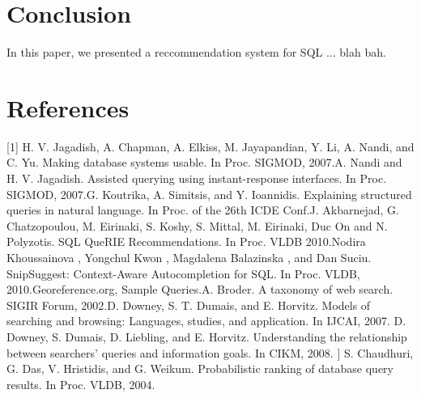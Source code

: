 \documentclass{acm_proc_article-sp}
\begin{document}
\section{Conclusion}
In this paper, we presented a reccommendation system for SQL ... blah bah. 

\section{References}
[1] H. V. Jagadish, A. Chapman, A. Elkiss, M. Jayapandian, Y. Li, A. Nandi, and C. Yu. Making database systems usable. In Proc. SIGMOD, 2007.\newline
[2] A. Nandi and H. V. Jagadish. Assisted querying using instant-response interfaces. In Proc. SIGMOD, 2007.\newline
[3] G. Koutrika, A. Simitsis, and Y. Ioannidis. Explaining structured queries in natural language. In Proc. of the 26th ICDE Conf.\newline
[4] J. Akbarnejad, G. Chatzopoulou, M. Eirinaki, S. Koshy, S. Mittal, M. Eirinaki, Duc On and N. Polyzotis. SQL QueRIE Recommendations. In Proc. VLDB 2010.\newline
[5] Nodira Khoussainova , Yongchul Kwon , Magdalena Balazinska , and Dan Suciu. SnipSuggest: Context-Aware Autocompletion for SQL. In Proc. VLDB, 2010.\newline
[6] Georeference.org, Sample Queries.\newline
[7] A. Broder. A taxonomy of web search. SIGIR Forum, 2002.\newline
[8] D. Downey, S. T. Dumais, and E. Horvitz. Models of searching and browsing: Languages, studies, and application. In IJCAI, 2007. \newline
[9] D. Downey, S. Dumais, D. Liebling, and E. Horvitz. Understanding the relationship between searchers’ queries and information goals. In CIKM, 2008. \newline
[10] ] S. Chaudhuri, G. Das, V. Hristidis, and G. Weikum. Probabilistic ranking of database query results. In Proc. VLDB, 2004.
\end{document}

